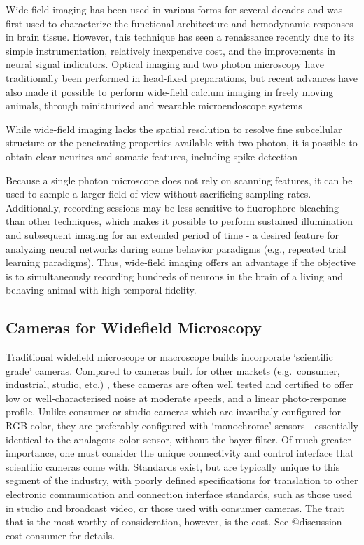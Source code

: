 \documentclass[../main.tex]{subfiles}
\begin{document}
Wide-field imaging has been used in various forms for several decades and was first used to characterize the functional architecture and hemodynamic responses in brain tissue.
However, this technique has seen a renaissance recently due to its simple instrumentation, relatively inexpensive cost, and the improvements in neural signal indicators.
Optical imaging and two photon microscopy have traditionally been performed in head-fixed preparations, but recent advances have also made it possible to perform wide-field calcium imaging in freely moving animals, through miniaturized and wearable microendoscope systems

While wide-field imaging lacks the spatial resolution to resolve fine subcellular structure or the penetrating properties available with two-photon, it is possible to obtain clear neurites and somatic features, including spike detection

Because a single photon microscope does not rely on scanning features, it can be used to sample a larger field of view without sacrificing sampling rates.
Additionally, recording sessions may be less sensitive to fluorophore bleaching than other techniques, which makes it possible to perform sustained illumination and subsequent imaging for an extended period of time - a desired feature for analyzing neural networks during some behavior paradigms (e.g., repeated trial learning paradigms).
Thus, wide-field imaging offers an advantage if the objective is to simultaneously recording hundreds of neurons in the brain of a living and behaving animal with high temporal fidelity.

\subsection{Cameras for Widefield Microscopy}\label{sec:cameras-for-widefield-microscopy}

Traditional widefield microscope or macroscope builds incorporate `scientific grade' cameras.
Compared to cameras built for other markets (e.g.~consumer, industrial, studio, etc.)
, these cameras are often well
tested and certified to offer low or well-characterised noise at
moderate speeds, and a linear photo-response profile.
Unlike consumer or studio cameras which are invaribaly configured for RGB color, they are preferably configured with `monochrome' sensors - essentially identical to the analagous color sensor, without the bayer filter.
Of much greater importance, one must consider the unique connectivity and control interface that scientific cameras come with.
Standards exist, but are typically unique to this segment of the industry, with poorly defined specifications for translation to other electronic communication and connection interface standards, such as those used in studio and broadcast video, or those used with consumer cameras.
The trait that is the most worthy of consideration, however, is the cost.
See @discussion-cost-consumer for details.
\end{document}
